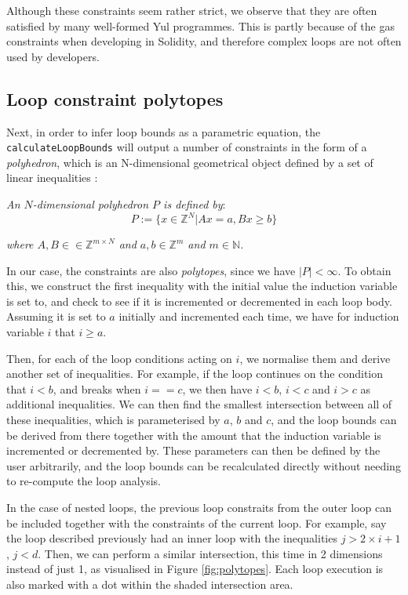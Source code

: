 Although these constraints seem rather strict, we observe that they are often satisfied by many well-formed Yul programmes.
This is partly because of the gas constraints when developing in Solidity, and therefore complex loops are not often used 
by developers.

\subsection{Loop constraint polytopes}

Next, in order to infer loop bounds as a parametric equation, the \texttt{calculateLoopBounds} will output a number of 
constraints in the form of a \textit{polyhedron}, which is an N-dimensional geometrical object defined by a set of linear
inequalities \cite{loopanalysis}:

\begin{definition}[polyhedrons]

  \textit{An $N$-dimensional polyhedron $P$ is defined by}:
  \[
    P := \{ x \in \mathbb{Z}^N | Ax = a, Bx \geq b \}
  \]

  \textit{where $A, B \in \in \mathbb{Z}^{m \times N}$ and $a, b \in \mathbb{Z}^m$ and $m \in \mathbb{N}$.}

\end{definition}

In our case, the constraints are also \textit{polytopes}, since we have $|P| < \infty$. To obtain this,
we construct the first inequality with the initial value the induction variable is set to, and check to see
if it is incremented or decremented in each loop body. Assuming it is set to $a$ initially and incremented each time, 
we have for induction variable $i$ that $i \geq a$. 

Then, for each of the loop conditions acting on $i$, we normalise them and derive another set of inequalities. For example,
if the loop continues on the condition that $i < b$, and breaks when $i == c$, we then have $i < b$, $i < c$ and $i > c$ as additional
inequalities. We can then find the smallest intersection between all of these inequalities, which is parameterised by $a$, $b$ and $c$,
and the loop bounds can be derived from there together with the amount that the induction variable is incremented or decremented by.
These parameters can then be defined by the user arbitrarily, and the loop bounds can be recalculated directly without needing to
re-compute the loop analysis.

In the case of nested loops, the previous loop constraits from the outer loop can be included together with the constraints of the
current loop. For example, say the loop described previously had an inner loop with the inequalities $j > 2 \times i + 1$, $j < d$. Then, we
can perform a similar intersection, this time in 2 dimensions instead of just 1, as visualised in Figure \ref{fig:polytopes}.
Each loop execution is also marked with a dot within the shaded intersection area.

